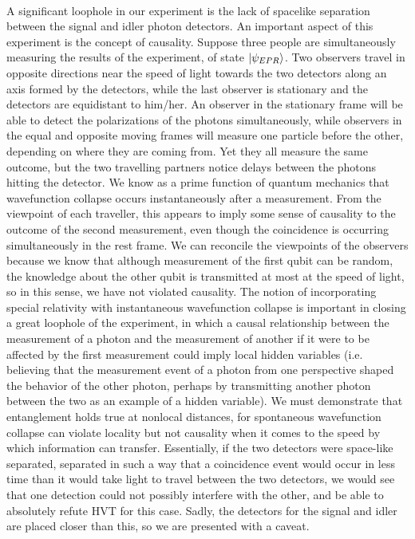 \documentclass{article}
\begin{document}
    \\\indent A significant loophole in our experiment is the lack of spacelike separation between the signal and idler photon detectors. An important aspect of this experiment is the concept of causality. Suppose three people are simultaneously measuring the results of the experiment, of state $\left\vert{\psi_{EPR}}\right\rangle$. Two observers travel in opposite directions near the speed of light towards the two detectors along an axis formed by the detectors, while the last observer is stationary and the detectors are equidistant to him/her. An observer in the stationary frame will be able to detect the polarizations of the photons simultaneously, while observers in the equal and opposite moving frames will measure one particle before the other, depending on where they are coming from. Yet they all measure the same outcome, but the two travelling partners notice delays between the photons hitting the detector. We know as a prime function of quantum mechanics that wavefunction collapse occurs instantaneously after a measurement. From the viewpoint of each traveller, this appears to imply some sense of causality to the outcome of the second measurement, even though the coincidence is occurring simultaneously in the rest frame. We can reconcile the viewpoints of the observers because we know that although measurement of the first qubit can be random, the knowledge about the other qubit is transmitted at most at the speed of light, so in this sense, we have not violated causality. The notion of incorporating special relativity with instantaneous wavefunction collapse is important in closing a great loophole of the experiment, in which a causal relationship between the measurement of a photon and the measurement of another if it were to be affected by the first measurement could imply local hidden variables (i.e. believing that the measurement event of a photon from one perspective shaped the behavior of the other photon, perhaps by transmitting another photon between the two as an example of a hidden variable). We must demonstrate that entanglement holds true at nonlocal distances, for spontaneous wavefunction collapse can violate locality but not causality when it comes to the speed by which information can transfer. Essentially, if the two detectors were space-like separated, separated in such a way that a coincidence event would occur in less time than it would take light to travel between the two detectors, we would see that one detection could not possibly interfere with the other, and be able to absolutely refute HVT for this case. Sadly, the detectors for the signal and idler are placed closer than this, so we are presented with a caveat.
\end{document}
